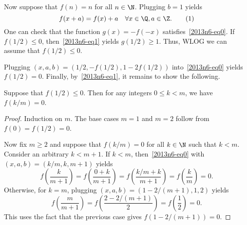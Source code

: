 Now suppose that $f(n) = n$ for all $n \in \N$.
Plugging $b = 1$ yields
\[ f(x + a) = f(x) + a \quad \forall x \in \Q, a \in \Z. \tag{1}\label{2013n6-eq1} \]
One can check that the function $g(x) = -f(-x)$ satisfies~\eqref{2013n6-eq0}.
If $f(1/2) \leq 0$, then~\eqref{2013n6-eq1} yields $g(1/2) \geq 1$.
Thus, WLOG we can assume that $f(1/2) \leq 0$.

Plugging $(x, a, b) = (1/2, -f(1/2), 1 - 2 f(1/2))$ into~\eqref{2013n6-eq0} yields $f(1/2) = 0$.
Finally, by~\eqref{2013n6-eq1}, it remains to show the following.

\begin{claim}
Suppose that $f(1/2) \leq 0$.
Then for any integers $0 \leq k < m$, we have $f(k/m) = 0$.
\end{claim}
\begin{proof}
Induction on $m$.
The base cases $m = 1$ and $m = 2$ follow from $f(0) = f(1/2) = 0$.

Now fix $m \geq 2$ and suppose that $f(k/m) = 0$ for all $k \in \N$ such that $k < m$.
Consider an arbitrary $k < m + 1$.
If $k < m$, then~\eqref{2013n6-eq0} with $(x, a, b) = (k/m, k, m + 1)$ yields
\[ f\left(\frac{k}{m + 1}\right) = f\left(\frac{0 + k}{m + 1}\right) = f\left(\frac{k/m + k}{m + 1}\right) = f\left(\frac{k}{m}\right) = 0. \]
Otherwise, for $k = m$, plugging $(x, a, b) = (1 - 2/(m + 1), 1, 2)$ yields
\[ f\left(\frac{m}{m + 1}\right) = f\left(\frac{2 - 2/(m + 1)}{2}\right) = f\left(\frac{1}{2}\right) = 0. \]
This uses the fact that the previous case gives $f(1 - 2/(m + 1)) = 0$.
\end{proof}
